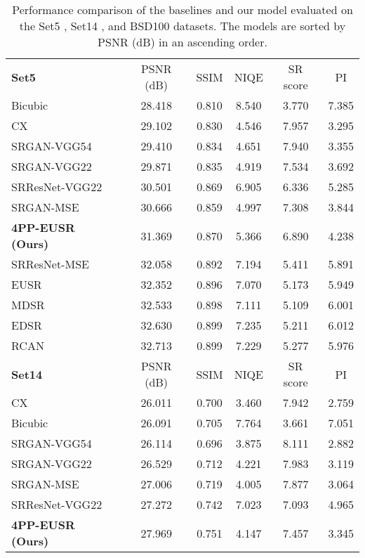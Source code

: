 \documentclass[runningheads]{llncs}
\begin{document}
\begin{table}[t]
	\setlength{\tabcolsep}{0.4em}
	\scriptsize
	\centering
	\caption{Performance comparison of the baselines and our model evaluated on the Set5 \cite{bevilacqua2012low}, Set14 \cite{zeyde2010single}, and BSD100 \cite{martin2001database} datasets. The models are sorted by PSNR (dB) in an ascending order.}
	\label{table:result_baseline_comparison}
	\begin{tabular}{lccccc}
		\textbf{Set5} & PSNR (dB) & SSIM & NIQE & SR score & PI \\
		\noalign{\smallskip}
		\hline
		\noalign{\smallskip}
		Bicubic & 28.418 & 0.810 & 8.540 & 3.770 & 7.385 \\
		CX & 29.102 & 0.830 & 4.546 & 7.957 & 3.295 \\
		SRGAN-VGG54 & 29.410 & 0.834 & 4.651 & 7.940 & 3.355 \\
		SRGAN-VGG22 & 29.871 & 0.835 & 4.919 & 7.534 & 3.692 \\
		SRResNet-VGG22 & 30.501 & 0.869 & 6.905 & 6.336 & 5.285 \\
		SRGAN-MSE & 30.666 & 0.859 & 4.997 & 7.308 & 3.844 \\
		\textbf{4PP-EUSR (Ours)} & 31.369 & 0.870 & 5.366 & 6.890 & 4.238 \\
		SRResNet-MSE & 32.058 & 0.892 & 7.194 & 5.411 & 5.891 \\
		EUSR & 32.352 & 0.896 & 7.070 & 5.173 & 5.949 \\
		MDSR & 32.533 & 0.898 & 7.111 & 5.109 & 6.001 \\
		EDSR & 32.630 & 0.899 & 7.235 & 5.211 & 6.012 \\
		RCAN & 32.713 & 0.899 & 7.229 & 5.277 & 5.976 \\
		\noalign{\smallskip}
		\noalign{\smallskip}
		\textbf{Set14} & PSNR (dB) & SSIM & NIQE & SR score & PI \\
		\noalign{\smallskip}
		\hline
		\noalign{\smallskip}
		CX & 26.011 & 0.700 & 3.460 & 7.942 & 2.759 \\
		Bicubic & 26.091 & 0.705 & 7.764 & 3.661 & 7.051 \\
		SRGAN-VGG54 & 26.114 & 0.696 & 3.875 & 8.111 & 2.882 \\
		SRGAN-VGG22 & 26.529 & 0.712 & 4.221 & 7.983 & 3.119 \\
		SRGAN-MSE & 27.006 & 0.719 & 4.005 & 7.877 & 3.064 \\
		SRResNet-VGG22 & 27.272 & 0.742 & 7.023 & 7.093 & 4.965 \\
		\textbf{4PP-EUSR (Ours)} & 27.969 & 0.751 & 4.147 & 7.457 & 3.345 \\

\end{tabular}
\end{table}
\end{document}
